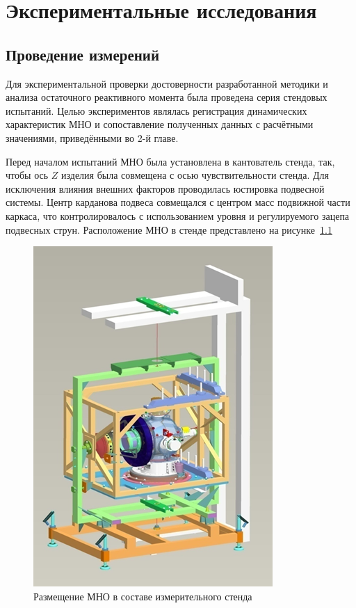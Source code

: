 \chapter{Экспериментальные исследования}\label{ch:ch4}

\section{Проведение измерений}

Для экспериментальной проверки достоверности разработанной методики и анализа остаточного реактивного момента была проведена серия стендовых испытаний. Целью экспериментов являлась регистрация динамических характеристик МНО и сопоставление полученных данных с расчётными значениями, приведёнными во 2-й главе.

Перед началом испытаний МНО была установлена в кантователь стенда, так, чтобы ось $Z$ изделия была совмещена с осью чувствительности стенда. Для исключения влияния внешних факторов проводилась юстировка подвесной системы. Центр карданова подвеса совмещался с центром масс подвижной части каркаса, что контролировалось с использованием уровня и регулируемого зацепа подвесных струн. Расположение МНО в стенде представлено на рисунке~\cref{fig:yoim-omn}

\begin{figure}[h!]
	\centering
	\includegraphics[scale=0.8]{images/yoim-omn}
	\caption{Размещение МНО в составе измерительного стенда}
	\label{fig:yoim-omn}
\end{figure}


